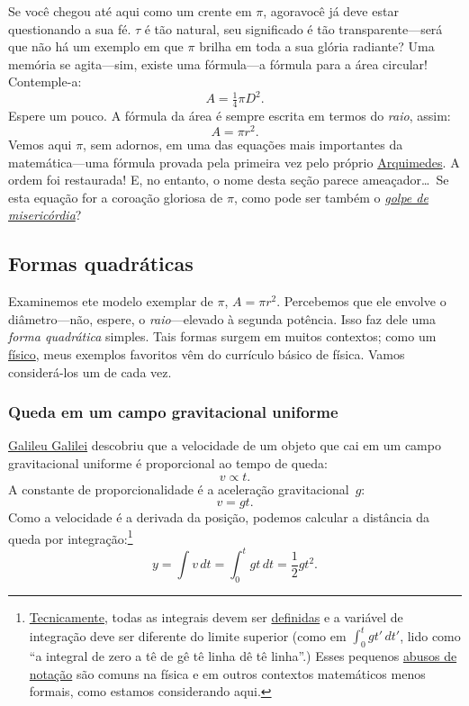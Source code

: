 Se você chegou até aqui como um crente em $\pi$,  agoravocê já deve estar questionando a sua fé. $\tau$ é tão natural, seu significado é tão transparente---será que não há um exemplo em que $\pi$ brilha em toda a sua glória radiante? Uma memória se agita---sim, existe uma fórmula---a fórmula para a área circular! Contemple-a:
\[ A = \tfrac{1}{4} \pi D^2. \]
Espere um pouco. A fórmula da área é sempre escrita em termos do \emph{raio}, assim:
\[ A = \pi r^2. \]
Vemos aqui $\pi$, sem adornos, em uma das equações mais importantes da matemática---uma fórmula provada pela primeira vez pelo próprio \href{https://pt.wikipedia.org/wiki/Arquimedes}{Arquimedes}. A ordem foi restaurada! E, no entanto, o nome desta seção parece ameaçador\ldots\ Se esta equação for a coroação gloriosa de $\pi$, como pode ser também o \href{https://pt.wikipedia.org/wiki/Golpe_de_miseric%C3%B3rdia}{\emph{golpe de misericórdia}}?

  \subsection{Formas quadráticas} %
  \label{sec:quadratic_forms}

Examinemos ete modelo exemplar de $\pi$, $A = \pi r^2$. Percebemos que ele envolve o diâmetro---não, espere, o \emph{raio}---elevado à segunda potência. Isso faz dele uma \emph{forma quadrática} simples. Tais formas surgem em muitos contextos; como um \href{https://thesis.library.caltech.edu/1940/}{físico}, meus exemplos favoritos vêm do currículo básico de física. Vamos considerá-los um de cada vez.

    \subsubsection{Queda em um campo gravitacional uniforme} %
    \label{sec:falling_in_a_uniform_gravitational_field}

\href{https://pt.wikipedia.org/wiki/Galileu_Galilei}{Galileu Galilei} descobriu que a velocidade de um objeto que cai em um campo gravitacional uniforme é proporcional ao tempo de queda:
\[ v \propto t. \]
A constante de proporcionalidade é a aceleração gravitacional~$g$:
\[ v = g t. \]
Como a velocidade é a derivada da posição, podemos calcular a distância da queda por integração:\footnote{\href{https://xkcd.com/1475/}{Tecnicamente}, todas as integrais devem ser \href{https://mathworld.wolfram.com/DefiniteIntegral.html}{definidas} e a variável de integração deve ser diferente do limite superior (como em $\int_0^t gt'\,dt'$, lido como ``a integral de zero a tê de gê tê linha dê tê linha''.) Esses pequenos \href{https://en.wikipedia.org/wiki/Abuse_of_notation}{abusos de notação} são comuns na física e em outros contextos matemáticos menos formais, como estamos considerando aqui.}
\[ y = \int v\,dt = \int_0^t gt\,dt = \textstyle{\frac{1}{2}} gt^2. \]


